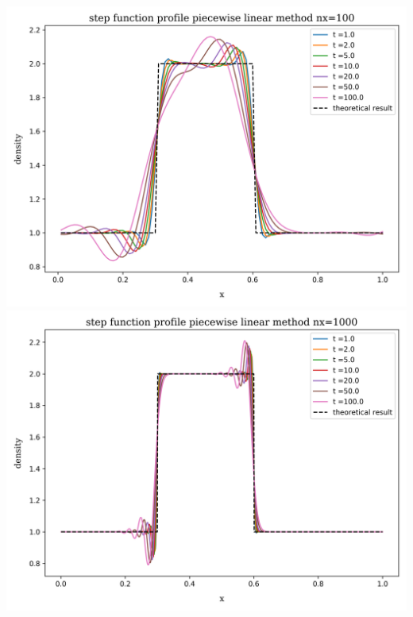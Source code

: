 \begin{frame}
	\vspace{10pt}
	\begin{columns}
			\centering
			\includegraphics[height=.33\textheight]{../results/1D/pwlin/nx=100/plot_advection_step_function_pwlin_nx=100.png}\\
			\includegraphics[height=.33\textheight]{../results/1D/pwlin/nx=1000/plot_advection_step_function_pwlin_nx=1000.png}\\

\end{columns}
\end{frame}

